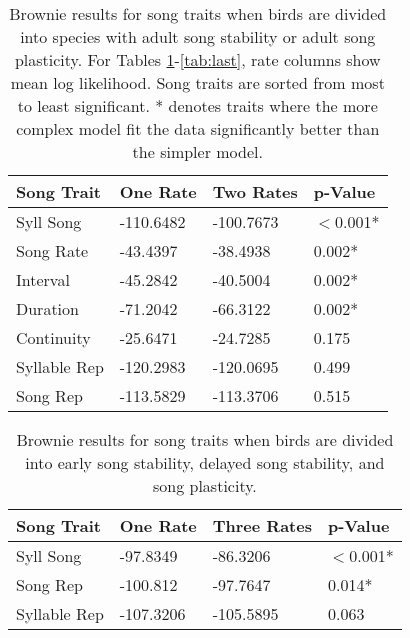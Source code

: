 \documentclass[a4paper,12pt]{article}
\begin{document}
\begin{table}[ht]
\caption{Brownie results for song traits when birds are divided into species with adult song stability or adult song plasticity.  For Tables \ref{tab:first}-\ref{tab:last}, rate columns show mean log likelihood.  Song traits are sorted from most to least significant. * denotes traits where the more complex model fit the data significantly better than the simpler model.}
\label{tab:first}
\centering
\begin{tabular}{llll}
  \hline
Song Trait & One Rate & Two Rates & p-Value \\ 
  \hline
Syll Song & -110.6482 & -100.7673 &$<$0.001* \\ 
  Song Rate & -43.4397 & -38.4938 & 0.002* \\ 
  Interval & -45.2842 & -40.5004 & 0.002* \\ 
  Duration & -71.2042 & -66.3122 & 0.002* \\ 
  Continuity & -25.6471 & -24.7285 & 0.175 \\ 
  Syllable Rep & -120.2983 & -120.0695 & 0.499 \\ 
  Song Rep & -113.5829 & -113.3706 & 0.515 \\ 
   \hline
\end{tabular}
\end{table}









\begin{table}[ht]
\caption{Brownie results for song traits when birds are divided into early song stability, delayed song stability, and song plasticity.}
\centering
\begin{tabular}{llll}
  \hline
Song Trait & One Rate & Three Rates & p-Value \\ 
  \hline
  Syll Song & -97.8349 & -86.3206 &$<$0.001* \\ 
  Song Rep & -100.812 & -97.7647 & 0.014* \\ 
  Syllable Rep & -107.3206 & -105.5895 & 0.063 \\ 
   \hline
\end{tabular}
\end{table}
\end{document}
